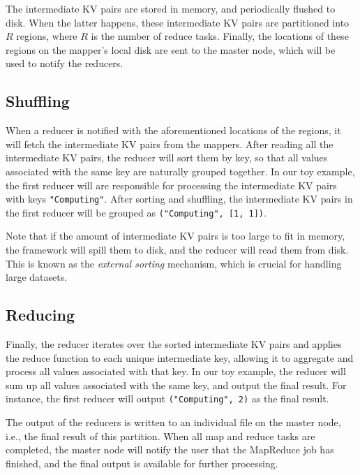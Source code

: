 The intermediate KV pairs are stored in memory, and periodically flushed to disk. When the latter happens, these intermediate KV pairs are partitioned into $R$ regions, where $R$ is the number of reduce tasks. Finally, the locations of these regions on the mapper's local disk are sent to the master node, which will be used to notify the reducers.

\subsection{Shuffling}

When a reducer is notified with the aforementioned locations of the regions, it will fetch the intermediate KV pairs from the mappers. After reading all the intermediate KV pairs, the reducer will sort them by key, so that all values associated with the same key are naturally grouped together. In our toy example, the first reducer will are responsible for processing the intermediate KV pairs with keys \texttt{"Computing"}. After sorting and shuffling, the intermediate KV pairs in the first reducer will be grouped as \texttt{("Computing", [1, 1])}.

Note that if the amount of intermediate KV pairs is too large to fit in memory, the framework will spill them to disk, and the reducer will read them from disk. This is known as the \textit{external sorting} mechanism, which is crucial for handling large datasets.

\subsection{Reducing}

Finally, the reducer iterates over the sorted intermediate KV pairs and applies the reduce function to each unique intermediate key, allowing it to aggregate and process all values associated with that key. In our toy example, the reducer will sum up all values associated with the same key, and output the final result. For instance, the first reducer will output \texttt{("Computing", 2)} as the final result. 

The output of the reducers is written to an individual file on the master node, i.e., the final result of this partition. When all map and reduce tasks are completed, the master node will notify the user that the MapReduce job has finished, and the final output is available for further processing.